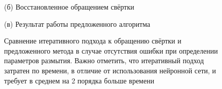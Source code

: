 \begin{figure}[H]
\begin{minipage}[t]{0.3\linewidth}
(б) Восстановленное обращением свёртки\\ 
\end{minipage}
\hfill
\begin{minipage}[t]{0.3\linewidth}
(в) Результат работы предложенного алгоритма\\ 
\end{minipage}
\caption{ Сравнение итеративного подхода к обращению свёртки и предложенного метода в случае отсутствия ошибки при определении параметров размытия. Важно отметить, что итеративный подход затратен по времени, в отличие от использования нейронной сети, и требует в среднем на 2 порядка больше времени}
\label{ris:restore_comparison}
\end{figure}



